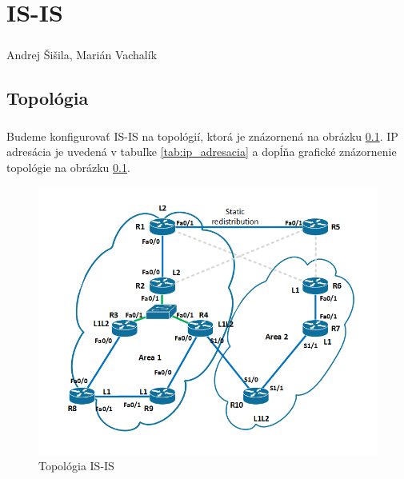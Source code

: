 \documentclass[12pt,twoside,a4paper]{report}
\begin{document}

\setcounter{chapter}{1}
\chapter*{IS-IS}
\paragraph{}
Andrej Šišila, Marián Vachalík

\tableofcontents

\newpage
\section{Topológia}
\paragraph{}
Budeme konfigurovať IS-IS na topológií, ktorá je znázornená na obrázku \ref{fig:isis_topo}. IP adresácia je uvedená v tabuľke \ref{tab:ip_adresacia} a dopĺňa grafické znázornenie topológie na obrázku \ref{fig:isis_topo}.

\begin{figure}[!htb]
\centering
\includegraphics[width=12cm,keepaspectratio]{isis_topo}
\caption{Topológia IS-IS}
\label{fig:isis_topo}
\end{figure}
\end{document}
